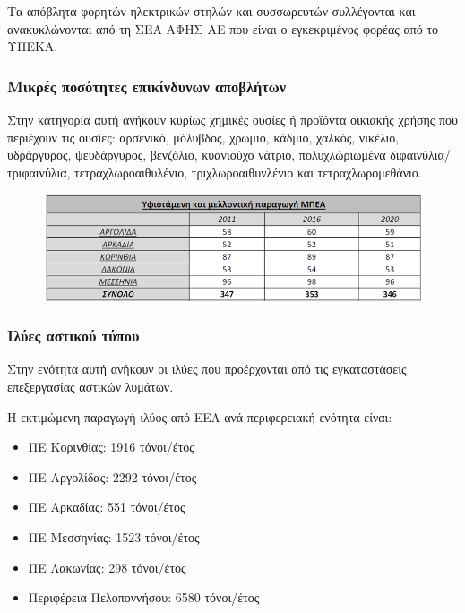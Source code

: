 \documentclass[12pt]{article}
\begin{document}
	Τα απόβλητα φορητών ηλεκτρικών στηλών και συσσωρευτών συλλέγονται και ανακυκλώνονται από τη ΣΕΑ ΑΦΗΣ ΑΕ που είναι ο εγκεκριμένος φορέας από το ΥΠΕΚΑ.
	
	\subsubsection{Μικρές ποσότητες επικίνδυνων αποβλήτων}
	
	Στην κατηγορία αυτή ανήκουν κυρίως χημικές ουσίες ή προϊόντα οικιακής χρήσης που περιέχουν τις ουσίες: αρσενικό, μόλυβδος, χρώμιο, κάδμιο, χαλκός, νικέλιο, υδράργυρος, ψευδάργυρος, βενζόλιο, κυανιούχο νάτριο, πολυχλώριωμένα διφαινύλια/τριφαινύλια, τετραχλωροαιθυλένιο, τριχλωροαιθυνλένιο και τετραχλωρομεθάνιο.
	
	\begin{figure} [H]
		\begin{center}
			\includegraphics [scale = 0.45] {table8.png}
		\end{center}
	\end{figure}

	\subsubsection{Ιλύες αστικού τύπου}
	
	Στην ενότητα αυτή ανήκουν οι ιλύες που προέρχονται από τις εγκαταστάσεις επεξεργασίας αστικών λυμάτων. 
	
	Η εκτιμώμενη παραγωγή ιλύος από ΕΕΛ ανά περιφερειακή ενότητα είναι: 
	\begin{itemize}
		\item ΠΕ Κορινθίας: 1916 τόνοι/έτος
		\item ΠΕ Αργολίδας: 2292 τόνοι/έτος
		\item ΠΕ Αρκαδίας: 551 τόνοι/έτος
		\item ΠΕ Μεσσηνίας: 1523 τόνοι/έτος
		\item ΠΕ Λακωνίας: 298 τόνοι/έτος
		\item Περιφέρεια Πελοποννήσου: 6580 τόνοι/έτος
	\end{itemize}
	
\end{document}
